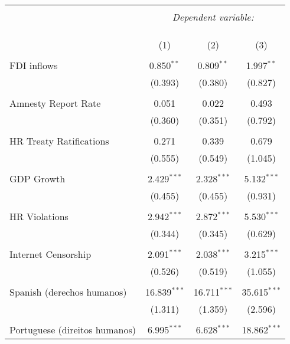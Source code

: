 
\begin{table}[!htbp] \centering 
  \caption{} 
  \label{} 
\begin{tabular}{@{\extracolsep{5pt}}lccc} 
\\[-1.8ex]\hline 
\hline \\[-1.8ex] 
 & \multicolumn{3}{c}{\textit{Dependent variable:}} \\ 
\cline{2-4} 
\\[-1.8ex] & \multicolumn{3}{c}{ } \\ 
\\[-1.8ex] & (1) & (2) & (3)\\ 
\hline \\[-1.8ex] 
 FDI inflows & 0.850$^{**}$ & 0.809$^{**}$ & 1.997$^{**}$ \\ 
  & (0.393) & (0.380) & (0.827) \\ 
  & & & \\ 
 Amnesty Report Rate & 0.051 & 0.022 & 0.493 \\ 
  & (0.360) & (0.351) & (0.792) \\ 
  & & & \\ 
 HR Treaty Ratifications & 0.271 & 0.339 & 0.679 \\ 
  & (0.555) & (0.549) & (1.045) \\ 
  & & & \\ 
 GDP Growth & 2.429$^{***}$ & 2.328$^{***}$ & 5.132$^{***}$ \\ 
  & (0.455) & (0.455) & (0.931) \\ 
  & & & \\ 
 HR Violations & 2.942$^{***}$ & 2.872$^{***}$ & 5.530$^{***}$ \\ 
  & (0.344) & (0.345) & (0.629) \\ 
  & & & \\ 
 Internet Censorship & 2.091$^{***}$ & 2.038$^{***}$ & 3.215$^{***}$ \\ 
  & (0.526) & (0.519) & (1.055) \\ 
  & & & \\ 
 Spanish (derechos humanos) & 16.839$^{***}$ & 16.711$^{***}$ & 35.615$^{***}$ \\ 
  & (1.311) & (1.359) & (2.596) \\ 
  & & & \\ 
 Portuguese (direitos humanos) & 6.995$^{***}$ & 6.628$^{***}$ & 18.862$^{***}$ \\ 

\end{tabular}
\end{table}
